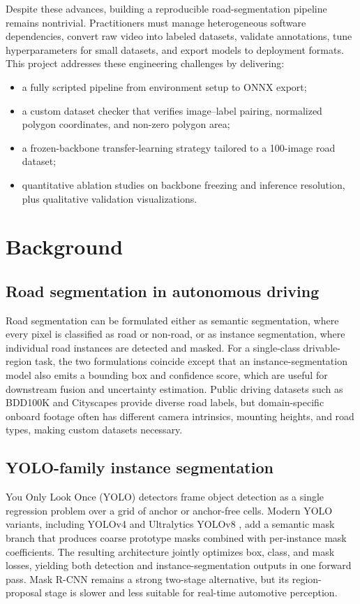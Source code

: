 \documentclass[11pt,a4paper]{article}
\begin{document}
Despite these advances, building a reproducible road-segmentation pipeline remains nontrivial. Practitioners must manage heterogeneous software dependencies, convert raw video into labeled datasets, validate annotations, tune hyperparameters for small datasets, and export models to deployment formats. This project addresses these engineering challenges by delivering:
\begin{itemize}[leftmargin=2em]
    \item a fully scripted pipeline from environment setup to ONNX export;
    \item a custom dataset checker that verifies image--label pairing, normalized polygon coordinates, and non-zero polygon area;
    \item a frozen-backbone transfer-learning strategy tailored to a 100-image road dataset;
    \item quantitative ablation studies on backbone freezing and inference resolution, plus qualitative validation visualizations.
\end{itemize}

\section{Background}\label{sec:background}

\subsection{Road segmentation in autonomous driving}

Road segmentation can be formulated either as semantic segmentation, where every pixel is classified as road or non-road, or as instance segmentation, where individual road instances are detected and masked. For a single-class drivable-region task, the two formulations coincide except that an instance-segmentation model also emits a bounding box and confidence score, which are useful for downstream fusion and uncertainty estimation. Public driving datasets such as BDD100K \cite{Yu2020BDD100K} and Cityscapes provide diverse road labels, but domain-specific onboard footage often has different camera intrinsics, mounting heights, and road types, making custom datasets necessary.

\subsection{YOLO-family instance segmentation}

You Only Look Once (YOLO) detectors frame object detection as a single regression problem over a grid of anchor or anchor-free cells. Modern YOLO variants, including YOLOv4 \cite{Bochkovskiy2020YOLOv4} and Ultralytics YOLOv8 \cite{Jocher2023Ultralytics}, add a semantic mask branch that produces coarse prototype masks combined with per-instance mask coefficients. The resulting architecture jointly optimizes box, class, and mask losses, yielding both detection and instance-segmentation outputs in one forward pass. Mask R-CNN \cite{He2017MaskRCNN} remains a strong two-stage alternative, but its region-proposal stage is slower and less suitable for real-time automotive perception.
\end{document}

